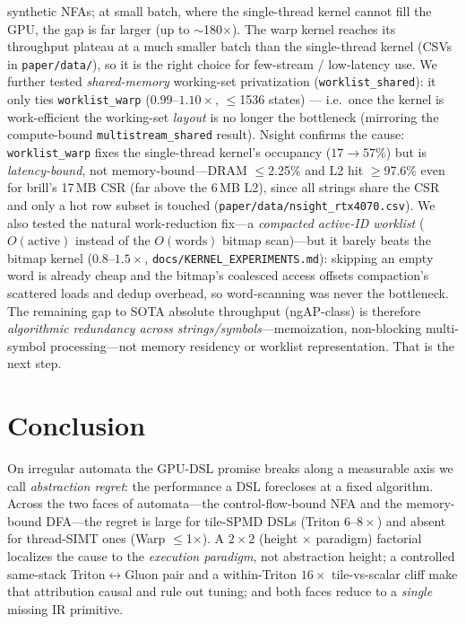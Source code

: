 \documentclass[conference]{IEEEtran}
\begin{document}
synthetic NFAs; at small batch, where the single-thread kernel cannot fill the GPU, the gap is
far larger (up to $\sim$180$\times$). The warp kernel reaches its throughput plateau at a much
smaller batch than the single-thread kernel (CSVs in \texttt{paper/data/}), so it is the right
choice for few-stream / low-latency use.
We further tested \emph{shared-memory} working-set privatization (\texttt{worklist\_shared}):
it only ties \texttt{worklist\_warp} ($0.99$--$1.10\times$, $\le$1536 states) ---
i.e.\ once the kernel is work-efficient the working-set \emph{layout} is no longer the
bottleneck (mirroring the compute-bound \texttt{multistream\_shared} result). Nsight confirms
the cause: \texttt{worklist\_warp} fixes the single-thread kernel's occupancy ($17\!\rightarrow\!57\%$)
but is \emph{latency-bound}, not memory-bound---DRAM $\le$2.25\% and L2 hit $\ge$97.6\% even for
brill's 17\,MB CSR (far above the 6\,MB L2), since all strings share the CSR and only a hot row
subset is touched (\texttt{paper/data/nsight\_rtx4070.csv}). We also tested the natural
work-reduction fix---a \emph{compacted active-ID worklist} ($O(\text{active})$ instead of the
$O(\text{words})$ bitmap scan)---but it barely beats the bitmap kernel ($0.8$--$1.5\times$,
\texttt{docs/KERNEL\_EXPERIMENTS.md}): skipping an empty word is already cheap and the bitmap's
coalesced access offsets compaction's scattered loads and dedup overhead, so word-scanning was
never the bottleneck. The remaining gap to SOTA absolute throughput (ngAP-class) is therefore
\emph{algorithmic redundancy across strings/symbols}---memoization, non-blocking multi-symbol
processing---not memory residency or worklist representation. That is the next step.

\section{Conclusion}
On irregular automata the GPU-DSL promise breaks along a measurable axis we call
\emph{abstraction regret}: the performance a DSL forecloses at a fixed algorithm. Across the two
faces of automata---the control-flow-bound NFA and the memory-bound DFA---the regret is large for
tile-SPMD DSLs (Triton $6$--$8\times$) and absent for thread-SIMT ones (Warp $\le$1$\times$). A
$2\times2$ (height $\times$ paradigm) factorial localizes the cause to the \emph{execution
paradigm}, not abstraction height; a controlled same-stack Triton$\leftrightarrow$Gluon pair and a
within-Triton $16\times$ tile-vs-scalar cliff make that attribution causal and rule out tuning; and
both faces reduce to a \emph{single} missing IR primitive.
\end{document}
